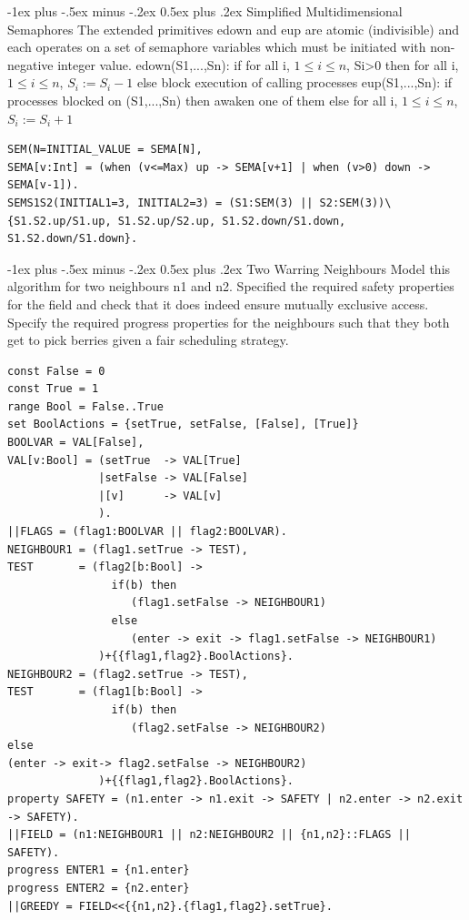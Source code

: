 \documentclass[letterpaper, 8pt]{extarticle}
\makeatletter
\renewcommand{\section}{\@startsection{section}{1}{0mm}%
                                {-1ex plus -.5ex minus -.2ex}%
                                {0.5ex plus .2ex}%
                                {\normalfont\normalsize\bfseries}}
\makeatother
\begin{document}
\begin{multicols*}{5}
  \section{Simplified Multidimensional Semaphores}
  The extended primitives edown and eup are atomic (indivisible) and each operates on a set of semaphore variables which must be initiated with non-negative integer value. edown(S1,...,Sn): if for all i, $1\leq i\leq n$, Si>0 then for all i, $1\leq i\leq n$, $S_i := S_i -1$ else block execution of calling processes eup(S1,...,Sn): if processes blocked on (S1,...,Sn) then awaken one of them else for all i, $1\leq i\leq n$, $S_i := S_i +1$
  \begin{lstlisting}
SEM(N=INITIAL_VALUE = SEMA[N],
SEMA[v:Int] = (when (v<=Max) up -> SEMA[v+1] | when (v>0) down -> SEMA[v-1]).
SEMS1S2(INITIAL1=3, INITIAL2=3) = (S1:SEM(3) || S2:SEM(3))\{S1.S2.up/S1.up, S1.S2.up/S2.up, S1.S2.down/S1.down, S1.S2.down/S1.down}.
\end{lstlisting} %

  \section{Two Warring Neighbours}
  Model this algorithm for two neighbours n1 and n2. Specified the required safety properties for the field and check that it does indeed ensure mutually exclusive access. Specify the required progress properties for the neighbours such that they both get to pick berries given a fair scheduling strategy.
  \begin{lstlisting}
const False = 0
const True = 1
range Bool = False..True
set BoolActions = {setTrue, setFalse, [False], [True]}
BOOLVAR = VAL[False],
VAL[v:Bool] = (setTrue  -> VAL[True]
              |setFalse -> VAL[False]
              |[v]      -> VAL[v]
              ).
||FLAGS = (flag1:BOOLVAR || flag2:BOOLVAR).
NEIGHBOUR1 = (flag1.setTrue -> TEST),
TEST       = (flag2[b:Bool] ->
                if(b) then
                   (flag1.setFalse -> NEIGHBOUR1)
                else
                   (enter -> exit -> flag1.setFalse -> NEIGHBOUR1)
              )+{{flag1,flag2}.BoolActions}.
NEIGHBOUR2 = (flag2.setTrue -> TEST),
TEST       = (flag1[b:Bool] ->
                if(b) then
                   (flag2.setFalse -> NEIGHBOUR2)
else
(enter -> exit-> flag2.setFalse -> NEIGHBOUR2)
              )+{{flag1,flag2}.BoolActions}.
property SAFETY = (n1.enter -> n1.exit -> SAFETY | n2.enter -> n2.exit -> SAFETY).
||FIELD = (n1:NEIGHBOUR1 || n2:NEIGHBOUR2 || {n1,n2}::FLAGS || SAFETY).
progress ENTER1 = {n1.enter} 
progress ENTER2 = {n2.enter}
||GREEDY = FIELD<<{{n1,n2}.{flag1,flag2}.setTrue}.
\end{lstlisting}


\end{multicols*}
\end{document}
